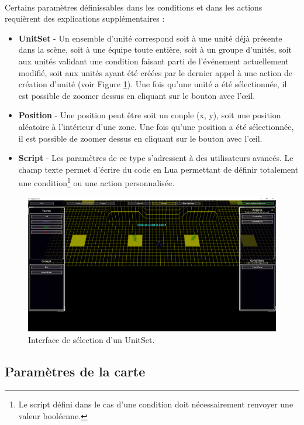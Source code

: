 \documentclass[a4paper]{article}
\begin{document}
\paragraph{ }
Certains paramètres définissables dans les conditions et dans les actions requièrent des explications supplémentaires :
\begin{itemize}
\item \textbf{UnitSet} - Un ensemble d'unité correspond soit à une unité déjà présente dans la scène, soit à une équipe toute entière, soit à un groupe d'unités, soit aux unités validant une condition faisant parti de l'événement actuellement modifié, soit aux unités ayant été créées par le dernier appel à une action de création d'unité (voir Figure \ref{fig:editor-pickunit}). Une fois qu'une unité a été sélectionnée, il est possible de zoomer dessus en cliquant sur le bouton avec l'œil.
\item \textbf{Position} - Une position peut être soit un couple (x, y), soit une position aléatoire à l'intérieur d'une zone. Une fois qu'une position a été sélectionnée, il est possible de zoomer dessus en cliquant sur le bouton avec l'œil.
\item \textbf{Script} - Les paramètres de ce type s'adressent à des utilisateurs avancés. Le champ texte permet d'écrire du code en Lua permettant de définir totalement une condition\footnote{Le script défini dans le cas d'une condition doit nécessairement renvoyer une valeur booléenne.} ou une action personnalisée.
\end{itemize}
\begin{figure}[H]
\centering
\includegraphics[width=\linewidth]{editor-pickunit.png}
\caption{Interface de sélection d'un UnitSet.}
\label{fig:editor-pickunit}
\end{figure}
\subsection{Paramètres de la carte}\label{mapsettings}
\end{document}
